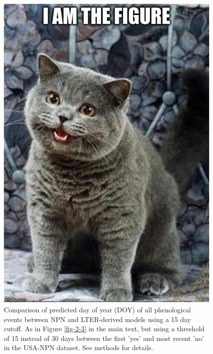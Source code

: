 \begin{figure}
	\centering
	\includegraphics[scale=0.5]{images/figure_filler.jpg}
	\caption[Comparison of predicted day of year (DOY) of all phenological events between NPN
and LTER-derived models using a 15 day cutoff]{Comparison of predicted day of year (DOY) of all phenological events between NPN and LTER-derived models using a 15 day cutoff. As in Figure \ref{fig-2-3} in the main text, but using a threshold of 15 instead of 30 days between the first 'yes' and most recent 'no' in the USA-NPN dataset. See methods for details.} \label{fig-a-3}
\end{figure}

